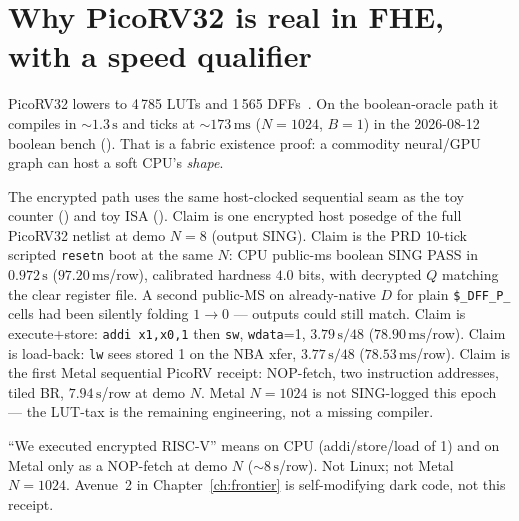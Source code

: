 

\section{Why PicoRV32 is real in FHE, with a speed qualifier}

PicoRV32 lowers to 4\,785 LUTs and 1\,565 DFFs~\cite{picorv32}.
On the boolean-oracle path it compiles in ${\sim}1.3\,\mathrm{s}$ and ticks
at ${\sim}173\,\mathrm{ms}$ ($N=1024$, $B=1$) in the 2026-08-12 boolean bench
().
That is a fabric existence proof: a commodity neural/GPU graph can host a
soft CPU's \emph{shape}.

The encrypted path uses the same host-clocked sequential seam as the toy
counter () and toy ISA ().
Claim  is one encrypted host posedge of the full PicoRV32 netlist at
demo $N{=}8$ (output SING).
Claim  is the PRD 10-tick scripted \texttt{resetn} boot at the same
$N$: CPU public-ms boolean SING PASS in $0.972\,\mathrm{s}$ ($97.20\,\mathrm{ms}$/row),
calibrated hardness $4.0$ bits, with decrypted $Q$ matching the clear
register file.
A second public-MS on already-native $D$ for plain \texttt{\$\_DFF\_P\_}
cells had been silently folding $1\to 0$ --- outputs could still match.
Claim  is execute+store: \texttt{addi x1,x0,1} then \texttt{sw},
\texttt{wdata}=1, $3.79\,\mathrm{s}/48$ ($78.90\,\mathrm{ms}$/row).
Claim  is load-back: \texttt{lw} sees stored 1 on the NBA xfer,
$3.77\,\mathrm{s}/48$ ($78.53\,\mathrm{ms}$/row).
Claim  is the first Metal sequential PicoRV receipt: NOP-fetch,
two instruction addresses, tiled BR, $7.94\,\mathrm{s}$/row at demo $N$.
Metal $N{=}1024$ is not SING-logged this epoch --- the LUT-tax is the
remaining engineering, not a missing compiler.

\begin{warning}
``We executed encrypted RISC-V'' means  on CPU (addi/store/load of 1)
and  on Metal only as a NOP-fetch at demo $N$ ($\sim 8\,\mathrm{s}$/row).
Not Linux; not Metal $N{=}1024$.
Avenue~2 in Chapter~\ref{ch:frontier} is self-modifying dark code, not this
receipt.
\end{warning}

